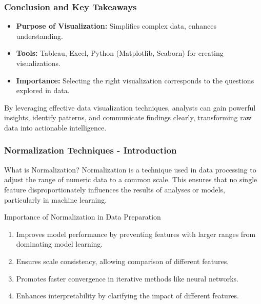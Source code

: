 \documentclass[aspectratio=169]{beamer}
\begin{document}
\begin{frame}[fragile]
    \frametitle{Conclusion and Key Takeaways}
    \begin{itemize}
        \item \textbf{Purpose of Visualization:} Simplifies complex data, enhances understanding.
        \item \textbf{Tools:} Tableau, Excel, Python (Matplotlib, Seaborn) for creating visualizations.
        \item \textbf{Importance:} Selecting the right visualization corresponds to the questions explored in data.
    \end{itemize}
    
    By leveraging effective data visualization techniques, analysts can gain powerful insights, identify patterns, and communicate findings clearly, transforming raw data into actionable intelligence.
\end{frame}

\begin{frame}[fragile]
    \frametitle{Normalization Techniques - Introduction}
    \begin{block}{What is Normalization?}
        Normalization is a technique used in data processing to adjust the range of numeric data to a common scale. This ensures that no single feature disproportionately influences the results of analyses or models, particularly in machine learning.
    \end{block}
    \begin{block}{Importance of Normalization in Data Preparation}
        \begin{enumerate}
            \item Improves model performance by preventing features with larger ranges from dominating model learning.
            \item Ensures scale consistency, allowing comparison of different features.
            \item Promotes faster convergence in iterative methods like neural networks.
            \item Enhances interpretability by clarifying the impact of different features.
        \end{enumerate}
    \end{block}
\end{frame}
\end{document}
